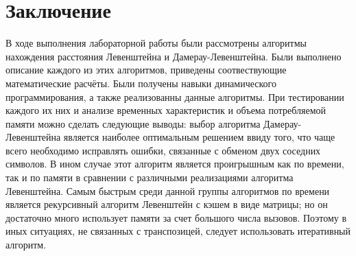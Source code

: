 \chapter*{Заключение}
В ходе выполнения лабораторной работы были рассмотрены алгоритмы нахождения расстояния Левенштейна и Дамерау-Левенштейна. Были выполнено описание каждого из этих алгоритмов, приведены соотвествующие математические расчёты. Были получены навыки динамического программирования, а также реализованны данные алгоритмы. При тестировании каждого их них и анализе временных характеристик и объема потребляемой памяти можно сделать следующие выводы: выбор алгоритма Дамерау-Левенштейна является наиболее оптимальным решением ввиду того, что чаще всего необходимо исправлять ошибки, связанные с обменом двух соседних символов. В ином случае этот алгоритм является проигрышным как по времени, так и по памяти в сравнении с различными реализациями алгоритма Левенштейна. Самым быстрым среди данной группы алгоритмов по времени является рекурсивный алгоритм Левенштейн с кэшем в виде матрицы; но он достаточно много использует памяти за счет большого числа вызовов. Поэтому в иных ситуациях, не связанных с транспозицей, следует использовать итеративный алгоритм.
  